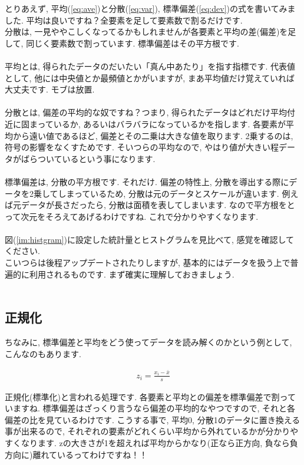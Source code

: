 \documentclass[11pt,a4paper]{jreport}
\begin{document}
とりあえず, 平均(\ref{eq:ave})と分散(\ref{eq:var}), 標準偏差(\ref{eq:dev})の式を書いてみました. 平均は良いですね？全要素を足して要素数で割るだけです.\\
分散は, 一見ややこしくなってるかもしれませんが各要素と平均の差(偏差)を足して, 同じく要素数で割っています. 標準偏差はその平方根です.\\
\\
平均とは, 得られたデータのだいたい「真ん中あたり」を指す指標です. 代表値として, 他には中央値とか最頻値とかがいますが, まあ平均値だけ覚えていれば大丈夫です. モブは放置.\\
\\
分散とは, 偏差の平均的な奴ですね？つまり, 得られたデータはどれだけ平均付近に固まっているか, あるいはバラバラになっているかを指します. 各要素が平均から遠い値であるほど, 偏差とその二乗は大きな値を取ります. 2乗するのは, 符号の影響をなくすためです. そいつらの平均なので, やはり値が大きい程データがばらついているという事になります.\\
\\
標準偏差は, 分散の平方根です. それだけ. 偏差の特性上, 分散を導出する際にデータを2乗してしまっているため, 分散は元のデータとスケールが違います. 例えば元データが長さだったら, 分散は面積を表してしまいます. なので平方根をとって次元をそろえてあげるわけですね. これで分かりやすくなります.\\
\\
図(\ref{im:histgram})に設定した統計量とヒストグラムを見比べて, 感覚を確認してください.
\\
こいつらは後程アップデートされたりしますが, 基本的にはデータを扱う上で普遍的に利用されるものです. まず確実に理解しておきましょう.\\
\\

\subsection{正規化}
ちなみに, 標準偏差と平均をどう使ってデータを読み解くのかという例として, こんなのもあります.

\begin{eqnarray}
z_i = \frac{x_i - \bar{x}}{s}
\end{eqnarray}

正規化(標準化)と言われる処理です. 各要素と平均との偏差を標準偏差で割っていますね. 標準偏差はざっくり言うなら偏差の平均的なやつですので, それと各偏差の比を見ているわけです. こうする事で, 平均0, 分散1のデータに置き換える事が出来るので, それぞれの要素がどれくらい平均から外れているかが分かりやすくなります. zの大きさが1を超えれば平均からかなり(正なら正方向, 負なら負方向に)離れているってわけですね！！\\
\end{document}
